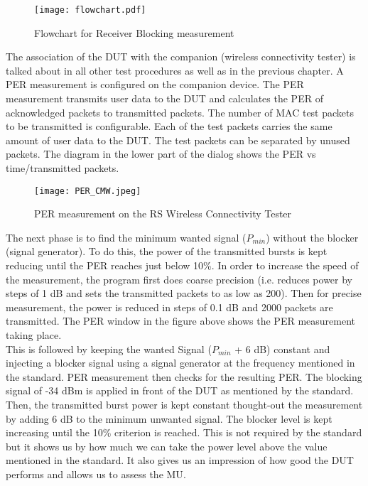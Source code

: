  \begin{figure}[H]
\centering
\texttt{[image: flowchart.pdf]} \vspace{-1.2cm}
\caption{Flowchart for Receiver Blocking measurement}
\label{fig:flowchartrxvlock}
\end{figure}

The association of the \acs{DUT} with the companion (wireless connectivity tester) is talked about in all other test procedures as well as in the previous chapter. A \acf{PER} measurement is configured on the companion device. The \acs{PER} measurement transmits user data to the \acs{DUT} and calculates the \acs{PER} of acknowledged packets to transmitted packets. The number of \acs{MAC} test packets to be transmitted is configurable. Each of the test packets carries the same amount of user data to the \acs{DUT}. The test packets can be separated by unused packets. The diagram in the lower part of the dialog shows the \acs{PER} vs time/transmitted packets.

 \begin{figure}[H]
\centering
\texttt{[image: PER\_CMW.jpeg]} 
\caption{\ac{PER} measurement on the \acs{RS} Wireless Connectivity Tester}
\label{fig:per}
\end{figure}

The next phase is to find the minimum wanted signal ($P_{min}$) without the blocker (signal generator). To do this, the power of the transmitted bursts is kept reducing until the \acs{PER} reaches just below 10\%. In order to increase the speed of the measurement, the program first does coarse precision (i.e. reduces power by steps of 1 dB and sets the transmitted packets to as low as 200). Then for precise measurement, the power is reduced in steps of 0.1 dB and 2000 packets are transmitted. The \acs{PER} window in the figure above shows the \acs{PER} measurement taking place. \\
  
This is followed by keeping the wanted Signal ($P_{min}$ + 6 dB) constant and injecting a blocker signal using a signal generator at the frequency mentioned in the standard. \acs{PER} measurement then checks for the resulting \acs{PER}. The blocking signal of -34 dBm is applied in front of the \acs{DUT} as mentioned by the standard. Then, the transmitted burst power is kept constant thought-out the measurement by adding 6 dB to the minimum unwanted signal. The blocker level is kept increasing until the 10\% criterion is reached. This is not required by the standard but it shows us by how much we can take the power level above the value mentioned in the standard. It also gives us an impression of how good the \acs{DUT} performs and allows us to assess the \acf{MU}.




